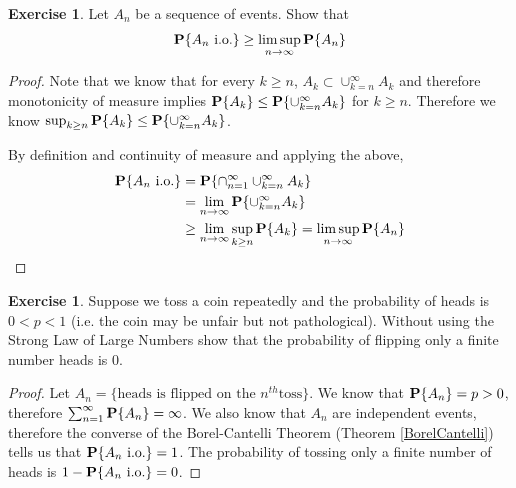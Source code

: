 \documentclass{amsart}
\theoremstyle{remark}
\theoremstyle{definition}
\newtheorem{ex}[thm]{Exercise}
\begin{document}
\begin{ex}Let $A_n$ be a sequence of events. Show that 
\begin{align*}
\textbf{P}\{A_n \text{ i.o.}\} \geq \limsup_{n \to \infty} \textbf{P}\{A_n\}
\end{align*}
\end{ex}
\begin{proof}
Note that we know that for every $k\geq n$, $A_k \subset
\cup_{k=n}^\infty A_k$ and therefore monotonicity of measure implies $\textbf{P}\{A_k\} \leq
\textbf{P}\{\cup_{k=n}^\infty A_k\}$ for $k\geq n$.  Therefore we know
$\sup_{k\geq n} \textbf{P}\{A_k\} \leq
\textbf{P}\{\cup_{k=n}^\infty A_k\}$.

By definition and continuity of measure and applying the above,
\begin{align*}
\textbf{P}\{A_n \text{ i.o.}\} &= \textbf{P}\{\cap_{n=1}^\infty
  \cup_{k=n}^\infty A_k\} \\
&= \lim_{n \to \infty} \textbf{P}\{\cup_{k=n}^\infty A_k\} \\
&\geq \lim_{n \to \infty} \sup_{k \geq n} \textbf{P}\{ A_k\} =
\limsup_{n \to \infty} \textbf{P}\{ A_n\} 
\end{align*}
\end{proof}

\begin{ex}Suppose we toss a coin repeatedly and the probability of
  heads is $0 < p < 1$ (i.e. the coin may be unfair but not
  pathological).  Without using the Strong Law of Large Numbers show
  that the probability of flipping only a finite number heads is $0$.
\end{ex}
\begin{proof}
Let $A_n = \lbrace \text{heads is flipped on the }n^{th}\text{
  toss}\rbrace$.  We know that $\textbf{P}\{A_n\} = p >0$, therefore
$\sum_{n=1}^\infty \textbf{P}\{A_n\} = \infty$.  We also know that
$A_n$ are independent events, therefore the converse of the
Borel-Cantelli Theorem (Theorem \ref{BorelCantelli}) tells us that $\textbf{P}\{ A_n \text{ i.o.}\}
= 1$.  The probability of tossing only a finite number of
heads is $1 - \textbf{P}\{ A_n \text{ i.o.}\} = 0$.
\end{proof}
\end{document}
